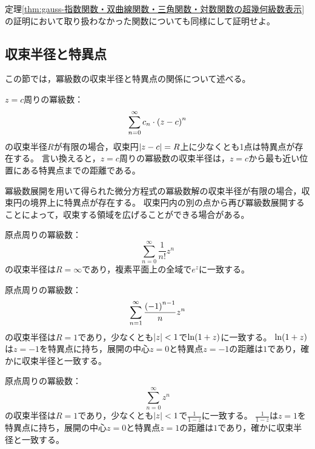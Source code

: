 \documentclass[a4paper,draft]{ltjsarticle}
\begin{document}
\begin{prob}
    定理\ref{thm:gauss-指数関数・双曲線関数・三角関数・対数関数の超幾何級数表示}の証明において取り扱わなかった関数についても同様にして証明せよ。
\end{prob}

\subsection{収束半径と特異点}\label{subsec:gauss-収束半径と特異点}
この節では，冪級数の収束半径と特異点の関係について述べる。

\begin{thm}
    $z=c$周りの冪級数：
    \begin{equation}
        \sum_{n=0}^\infty c_n\cdot \pare{z-c}^n
    \end{equation}
    の収束半径$R$が有限の場合，収束円$\abs{z-c}=R$上に少なくとも1点は特異点が存在する。
    言い換えると，$z=c$周りの冪級数の収束半径は，$z=c$から最も近い位置にある特異点までの距離である。
\end{thm}

冪級数展開を用いて得られた微分方程式の冪級数解の収束半径が有限の場合，収束円の境界上に特異点が存在する。
収束円内の別の点から再び冪級数展開することによって，収束する領域を広げることができる場合がある。

\begin{eg}
    原点周りの冪級数：
    \begin{equation}
        \sum_{n=0}^\infty \frac{1}{n!}z^n
    \end{equation}
    の収束半径は$R=\infty$であり，複素平面上の全域で$e^z$に一致する。
\end{eg}

\begin{eg}
    原点周りの冪級数：
    \begin{equation}
        \sum_{n=1}^\infty \frac{\pare{-1}^{n-1}}{n}z^{n}
    \end{equation}
    の収束半径は$R=1$であり，少なくとも$\abs{z}<1$で$\fun{\ln}{1+z}$に一致する。
    $\fun{\ln}{1+z}$は$z=-1$を特異点に持ち，展開の中心$z=0$と特異点$z=-1$の距離は$1$であり，確かに収束半径と一致する。
\end{eg}

\begin{eg}
    原点周りの冪級数：
    \begin{equation}
        \sum_{n=0}^\infty z^n
    \end{equation}
    の収束半径は$R=1$であり，少なくとも$\abs{z}<1$で$\frac{1}{1-z}$に一致する。
    $\frac{1}{1-z}$は$z=1$を特異点に持ち，展開の中心$z=0$と特異点$z=1$の距離は$1$であり，確かに収束半径と一致する。
\end{eg}
\end{document}
